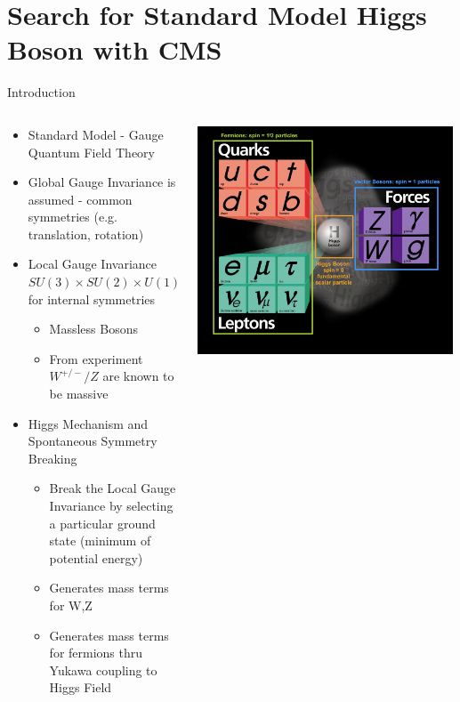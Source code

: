 \documentclass[pdf, 9pt]{beamer}
\begin{document}
\section{Search for Standard Model Higgs Boson with CMS}
  \begin{frame}{Introduction}
    \begin{columns}[T]
      \begin{column}{0.6\textwidth}
        \begin{itemize}
          \item Standard Model - Gauge Quantum Field Theory
          \item Global Gauge Invariance is assumed - common symmetries (e.g. translation, rotation)
          \item Local Gauge Invariance $SU(3) \times SU(2) \times U(1)$ for internal symmetries
            \begin{itemize}
              \item Massless Bosons
              \item From experiment $W^{+/-}/Z$ are known to be massive
            \end{itemize}
          \item Higgs Mechanism and Spontaneous Symmetry Breaking
            \begin{itemize}
              \item Break the Local Gauge Invariance by selecting a particular ground state (minimum of potential energy)
              \item Generates mass terms for W,Z
              \item Generates mass terms for fermions thru Yukawa coupling to Higgs Field
            \end{itemize}
         \end{itemize}
      \end{column}
      \begin{column}{0.4\textwidth}
        \begin{center}
          \includegraphics[width=0.99\textwidth, height=0.45\textheight]{figs/sm/sm.jpeg}

\end{center}
\end{column}
\end{columns}
\end{frame}
\end{document}
